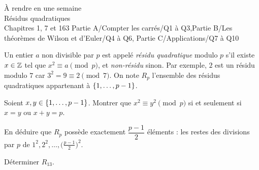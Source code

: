 
  {À rendre en une semaine\\Résidus quadratiques\\Chapitres 1, 7 et 16}{3}
  {Partie A/Compter les carrés/Q1 à Q3,Partie B/Les théorèmes de Wilson et d'Euler/Q4 à Q6,%
   Partie C/Applications/Q7 à Q10}
\enParties
{}

Un entier $a$ non divisible par $p$ est appelé \emph{résidu quadratique}
modulo $p$ s'il existe $x\in\mathbb{Z}$ tel que $x^{2}\equiv a\pmod p$, et
\emph{non-résidu} sinon. Par exemple, $2$ est un résidu modulo $7$ car
$3^{2}=9\equiv2\pmod7$. On note $R_p$ l'ensemble des résidus quadratiques
appartenant à $\left\{1,\dots,p-1\right\}$.

\begin{exoEval}{}{}
\begin{questions}
  \item Soient $x,y\in\left\{1,\dots,p-1\right\}$. Montrer que
    $x^{2}\equiv y^{2}\pmod p$ si et seulement si $x=y$ ou $x+y=p$.
  \item En déduire que $R_p$ possède exactement $\dfrac{p-1}{2}$ éléments :
    les restes des divisions par $p$ de $1^{2},2^{2},\dots,\bigl(\frac{p-1}{2}\bigr)^{2}$.
  \item Déterminer $R_{13}$.
\end{questions}
\end{exoEval}

